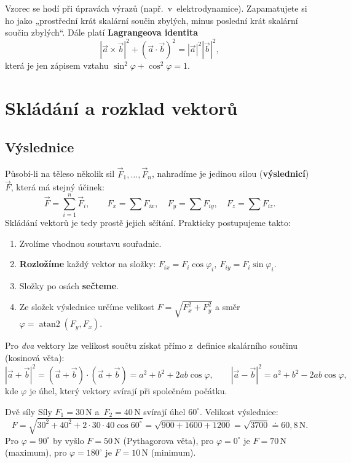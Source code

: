 \documentclass[a4paper,11pt]{article}
\newcommand{\abs}[1]{\left\lvert #1\right\rvert}
\newcommand{\jed}[1]{\,\mathrm{#1}}      %
\newcommand{\dc}{{,}}                    %
\begin{document}
Vzorec se hodí při úpravách výrazů (např.\ v~elektrodynamice). Zapamatujete si
ho jako „prostřední krát skalární součin zbylých, minus poslední krát skalární
součin zbylých“. Dále platí \textbf{Lagrangeova identita}
\[
  \abs{\vec a\times\vec b}^2+(\vec a\cdot\vec b)^2=\abs{\vec a}^2\abs{\vec b}^2,
\]
která je jen zápisem vztahu $\sin^2\varphi+\cos^2\varphi=1$.

\section{Skládání a rozklad vektorů}\label{sec:skladani}

\subsection{Výslednice}

Působí-li na těleso několik sil $\vec F_1,\dots,\vec F_n$, nahradíme je jedinou silou
(\textbf{výslednicí}) $\vec F$, která má stejný účinek:
\begin{equation}
  \vec F=\sum_{i=1}^{n}\vec F_i,\qquad
  F_x=\sum F_{ix},\quad F_y=\sum F_{iy},\quad F_z=\sum F_{iz}.
\end{equation}
Skládání vektorů je tedy prostě jejich sčítání. Prakticky postupujeme takto:
\begin{enumerate}
  \item Zvolíme vhodnou soustavu souřadnic.
  \item \textbf{Rozložíme} každý vektor na složky:
        $F_{ix}=F_i\cos\varphi_i,\ F_{iy}=F_i\sin\varphi_i$.
  \item Složky po osách \textbf{sečteme}.
  \item Ze složek výslednice určíme velikost
        $F=\sqrt{F_x^2+F_y^2}$ a směr $\varphi=\operatorname{atan2}(F_y,F_x)$.
\end{enumerate}

Pro \emph{dva} vektory lze velikost součtu získat přímo z~definice skalárního součinu
(kosinová věta):
\begin{equation}
  \abs{\vec a+\vec b}^2=(\vec a+\vec b)\cdot(\vec a+\vec b)=a^2+b^2+2ab\cos\varphi,
  \qquad
  \abs{\vec a-\vec b}^2=a^2+b^2-2ab\cos\varphi,
\end{equation}
kde $\varphi$ je úhel, který vektory svírají při společném počátku.

\begin{priklad}{Dvě síly}
Síly $F_1=30\jed{N}$ a~$F_2=40\jed{N}$ svírají úhel $60^\circ$. Velikost výslednice:
\[
  F=\sqrt{30^2+40^2+2\cdot30\cdot40\cos60^\circ}=\sqrt{900+1600+1200}=\sqrt{3700}\doteq60\dc8\jed{N}.
\]
Pro $\varphi=90^\circ$ by vyšlo $F=50\jed{N}$ (Pythagorova věta), pro $\varphi=0^\circ$
je $F=70\jed{N}$ (maximum), pro $\varphi=180^\circ$ je $F=10\jed{N}$ (minimum).
\end{priklad}
\end{document}
